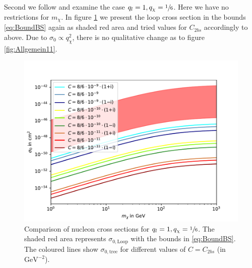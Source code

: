 Second we follow \cite{Z} and examine the case $q_l=1,q_\chi=\sfrac{1}{6}$. Here we have no restrictions for $m_\chi$. In figure \ref{fig:Allgemein116} we present the loop cross section in the bounds \eqref{eq:BoundBS} again as shaded red area and tried values for $C_{2bs}$ accordingly to above. Due to $\sigma_0\propto q_\chi^2$, there is no qualitative change as to figure \ref{fig:Allgemein11}.
\begin{figure}
	\centering
	\includegraphics[scale=.8]{content/graphics/Allgemein116.pdf}
	\caption{Comparison of nucleon cross sections for $q_l=1,q_\chi=\sfrac{1}{6}$. The shaded red area represents $\sigma_{0,\text{Loop}}$ with the bounds in \eqref{eq:BoundBS}. The coloured lines show $\sigma_{0,\text{tree}}$ for different values of $C = C_{2bs}$ (in $\si{\giga\electronvolt}^{-2}$).}
	\label{fig:Allgemein116}
\end{figure}



